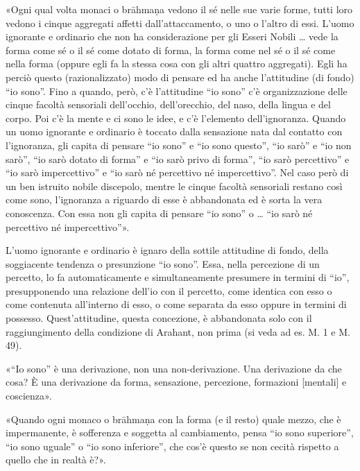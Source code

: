 

«Ogni qual volta monaci o brāhmaṇa vedono il sé nelle sue varie forme,
tutti loro vedono i cinque aggregati affetti dall’attaccamento, o uno o
l’altro di essi. L’uomo ignorante e ordinario che non ha considerazione
per gli Esseri Nobili … vede la forma come sé o il sé come dotato di
forma, la forma come nel sé o il sé come nella forma (oppure egli fa la
stessa cosa con gli altri quattro aggregati). Egli ha perciò questo
(razionalizzato) modo di pensare ed ha anche l’attitudine (di fondo) “io
sono”. Fino a quando, però, c’è l’attitudine “io sono” c’è
organizzazione delle cinque facoltà sensoriali dell’occhio,
dell’orecchio, del naso, della lingua e del corpo. Poi c’è la mente e ci
sono le idee, e c’è l’elemento dell’ignoranza. Quando un uomo ignorante
e ordinario è toccato dalla sensazione nata dal contatto con
l’ignoranza, gli capita di pensare “io sono” e “io sono questo”, “io
sarò” e “io non sarò”, “io sarò dotato di forma” e “io sarò privo di
forma”, “io sarò percettivo” e “io sarò impercettivo” e “io sarò né
percettivo né impercettivo”. Nel caso però di un ben istruito nobile
discepolo, mentre le cinque facoltà sensoriali restano così come sono,
l’ignoranza a riguardo di esse è abbandonata ed è sorta la vera
conoscenza. Con essa non gli capita di pensare “io sono” o … “io sarò né
percettivo né impercettivo”».




 L’uomo ignorante e ordinario è ignaro della sottile
attitudine di fondo, della soggiacente tendenza o presunzione “io sono”.
Essa, nella percezione di un percetto, lo fa automaticamente e
simultaneamente presumere in termini di “io”, presupponendo una
relazione dell’io con il percetto, come identica con esso o come
contenuta all’interno di esso, o come separata da esso oppure in termini
di possesso. Quest’attitudine, questa concezione, è abbandonata solo con
il raggiungimento della condizione di Arahant, non prima (si veda ad es.
M. 1 e M. 49).


 «“Io sono” è una derivazione, non una non-derivazione. Una
derivazione da che cosa? È una derivazione da forma, sensazione,
percezione, formazioni [mentali] e coscienza».




«Quando ogni monaco o brāhmaṇa con la forma (e il resto) quale mezzo,
che è impermanente, è sofferenza e soggetta al cambiamento, pensa “io
sono superiore”, “io sono uguale” o “io sono inferiore”, che cos’è
questo se non cecità rispetto a quello che in realtà è?».


